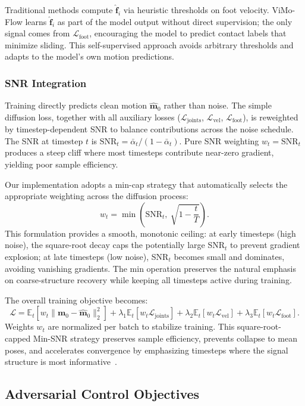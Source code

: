 Traditional methods compute $\hat{\mathbf{f}}_i$ via heuristic thresholds on foot velocity. ViMo-Flow learns $\hat{\mathbf{f}}_i$ as part of the model output without direct supervision; the only signal comes from $\mathcal{L}_{\text{foot}}$, encouraging the model to predict contact labels that minimize sliding. This self-supervised approach avoids arbitrary thresholds and adapts to the model's own motion predictions.

\subsubsection{SNR Integration}
Training directly predicts clean motion $\hat{\mathbf{m}}_0$ rather than noise. The simple diffusion loss, together with all auxiliary losses ($\mathcal{L}_{\text{joints}}$, $\mathcal{L}_{\text{vel}}$, $\mathcal{L}_{\text{foot}}$), is reweighted by timestep-dependent SNR to balance contributions across the noise schedule. The SNR at timestep $t$ is $\text{SNR}_t = \bar{\alpha}_t / (1-\bar{\alpha}_t)$. Pure SNR weighting $w_t = \text{SNR}_t$ produces a steep cliff where most timesteps contribute near-zero gradient, yielding poor sample efficiency.

Our implementation adopts a min-cap strategy that automatically selects the appropriate weighting across the diffusion process:
\[
w_t = \min\left( \text{SNR}_t,\ \sqrt{1 - \frac{t}{T}} \right).
\]
This formulation provides a smooth, monotonic ceiling: at early timesteps (high noise), the square-root decay caps the potentially large SNR$_t$ to prevent gradient explosion; at late timesteps (low noise), SNR$_t$ becomes small and dominates, avoiding vanishing gradients. The min operation preserves the natural emphasis on coarse-structure recovery while keeping all timesteps active during training.

The overall training objective becomes:
\[
\mathcal{L} = \mathbb{E}_t [ w_t \|\mathbf{m}_0 - \hat{\mathbf{m}}_0\|_2^2 ] + \lambda_1 \mathbb{E}_t [ w_t \mathcal{L}_{\text{joints}} ] + \lambda_2 \mathbb{E}_t [ w_t \mathcal{L}_{\text{vel}} ] + \lambda_3 \mathbb{E}_t [ w_t \mathcal{L}_{\text{foot}} ].
\]
Weights $w_t$ are normalized per batch to stabilize training. This square-root-capped Min-SNR strategy preserves sample efficiency, prevents collapse to mean poses, and accelerates convergence by emphasizing timesteps where the signal structure is most informative~\cite{minsnr2024}.

\subsection{Adversarial Control Objectives}
\label{sec:physics_losses}

